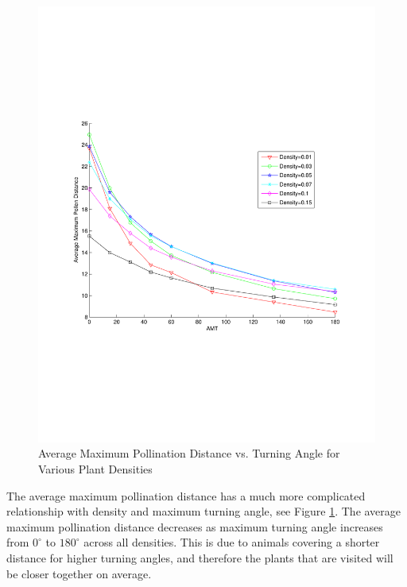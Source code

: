 \documentclass{tran-l}
\theoremstyle{definition}
\theoremstyle{remark}
\numberwithin{equation}{subsection}
\begin{document}
\begin{figure}
  \begin{center}
  \includegraphics[width=1.0\textwidth]{MaxPollenVsAMT.pdf}
  \end{center}
  \caption{\small Average Maximum Pollination Distance vs. Turning Angle for
Various Plant Densities}
  \label{AvgMaxDTreesN}
\end{figure}

The average maximum pollination distance has a much more complicated relationship with density and maximum turning angle, see Figure \ref{AvgMaxDTreesN}.  
The average maximum pollination distance decreases as maximum turning angle increases from
$0^{\circ}$ to $180^{\circ}$ across all densities. This is due to animals
covering a shorter distance for higher turning angles, and therefore the plants
that are visited will be closer together on average. 
\end{document}
